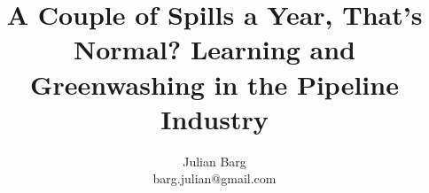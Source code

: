 \documentclass[12pt, man, natbib]{apa6}
\title{A Couple of Spills a Year, That's Normal? Learning and Greenwashing in the Pipeline Industry}
\author{Julian Barg\\barg.julian@gmail.com}
\affiliation{Ivey Business School}
\begin{document}
	
	\maketitle
	
	\singlespacing
	
%	
	
%	

%	

%	
	
%	
	
	
	
%	

% 	


\end{document}
